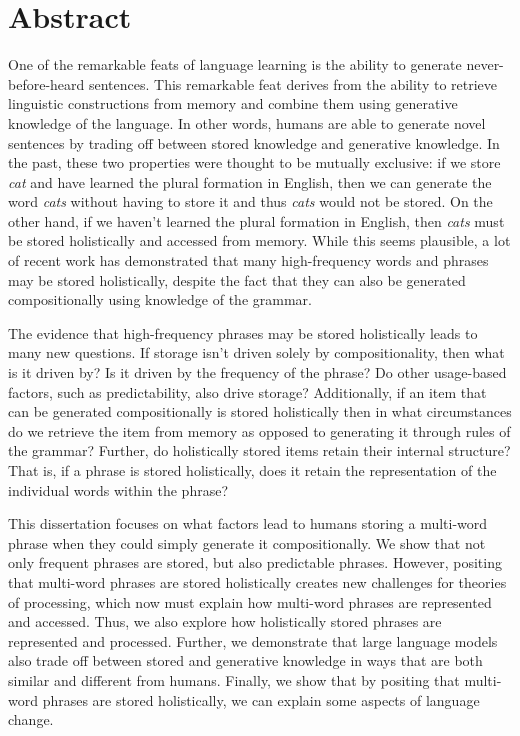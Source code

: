 \documentclass[
  12pt,
  letterpaper,
]{scrreport}
\begin{document}

\chapter*{Abstract}\label{sec-abstract}


One of the remarkable feats of language learning is the ability to
generate never-before-heard sentences. This remarkable feat derives from
the ability to retrieve linguistic constructions from memory and combine
them using generative knowledge of the language. In other words, humans
are able to generate novel sentences by trading off between stored
knowledge and generative knowledge. In the past, these two properties
were thought to be mutually exclusive: if we store \emph{cat} and have
learned the plural formation in English, then we can generate the word
\emph{cats} without having to store it and thus \emph{cats} would not be
stored. On the other hand, if we haven't learned the plural formation in
English, then \emph{cats} must be stored holistically and accessed from
memory. While this seems plausible, a lot of recent work has
demonstrated that many high-frequency words and phrases may be stored
holistically, despite the fact that they can also be generated
compositionally using knowledge of the grammar.

The evidence that high-frequency phrases may be stored holistically
leads to many new questions. If storage isn't driven solely by
compositionality, then what is it driven by? Is it driven by the
frequency of the phrase? Do other usage-based factors, such as
predictability, also drive storage? Additionally, if an item that can be
generated compositionally is stored holistically then in what
circumstances do we retrieve the item from memory as opposed to
generating it through rules of the grammar? Further, do holistically
stored items retain their internal structure? That is, if a phrase is
stored holistically, does it retain the representation of the individual
words within the phrase?

This dissertation focuses on what factors lead to humans storing a
multi-word phrase when they could simply generate it compositionally. We
show that not only frequent phrases are stored, but also predictable
phrases. However, positing that multi-word phrases are stored
holistically creates new challenges for theories of processing, which
now must explain how multi-word phrases are represented and accessed.
Thus, we also explore how holistically stored phrases are represented
and processed. Further, we demonstrate that large language models also
trade off between stored and generative knowledge in ways that are both
similar and different from humans. Finally, we show that by positing
that multi-word phrases are stored holistically, we can explain some
aspects of language change.
\end{document}
